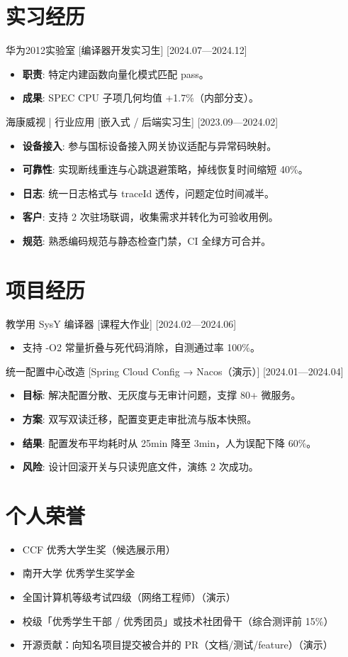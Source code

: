 \documentclass{resume-photo}
\begin{document}
\section{实习经历}
\ResumeItem
{华为2012实验室}
[\textnormal{编译器开发实习生}]
[2024.07—2024.12]

\begin{itemize}
  \item \textbf{职责}: 特定内建函数向量化模式匹配 pass。
  \item \textbf{成果}: SPEC CPU 子项几何均值 +1.7\%（内部分支）。
\end{itemize}


\ResumeItem
{海康威视 | 行业应用}
[\textnormal{嵌入式 / 后端实习生}]
[2023.09—2024.02]

\begin{itemize}
  \item \textbf{设备接入}: 参与国标设备接入网关协议适配与异常码映射。
  \item \textbf{可靠性}: 实现断线重连与心跳退避策略，掉线恢复时间缩短 40\%。
  \item \textbf{日志}: 统一日志格式与 traceId 透传，问题定位时间减半。
  \item \textbf{客户}: 支持 2 次驻场联调，收集需求并转化为可验收用例。
  \item \textbf{规范}: 熟悉编码规范与静态检查门禁，CI 全绿方可合并。
\end{itemize}



\section{项目经历}
\ResumeItem
{教学用 SysY 编译器}
[\textnormal{课程大作业}]
[2024.02—2024.06]

\begin{itemize}
  \item 支持 -O2 常量折叠与死代码消除，自测通过率 100\%。
\end{itemize}


\ResumeItem
{统一配置中心改造}
[\textnormal{Spring Cloud Config → Nacos（演示）}]
[2024.01—2024.04]

\begin{itemize}
  \item \textbf{目标}: 解决配置分散、无灰度与无审计问题，支撑 80+ 微服务。
  \item \textbf{方案}: 双写双读迁移，配置变更走审批流与版本快照。
  \item \textbf{结果}: 配置发布平均耗时从 25min 降至 3min，人为误配下降 60\%。
  \item \textbf{风险}: 设计回滚开关与只读兜底文件，演练 2 次成功。
\end{itemize}



\section{个人荣誉}
\begin{itemize}
  \item CCF 优秀大学生奖（候选展示用）
  \item 南开大学 优秀学生奖学金
  \item 全国计算机等级考试四级（网络工程师）（演示）
  \item 校级「优秀学生干部 / 优秀团员」或技术社团骨干（综合测评前 15\%）
  \item 开源贡献：向知名项目提交被合并的 PR（文档/测试/feature）（演示）
\end{itemize}
\end{document}

